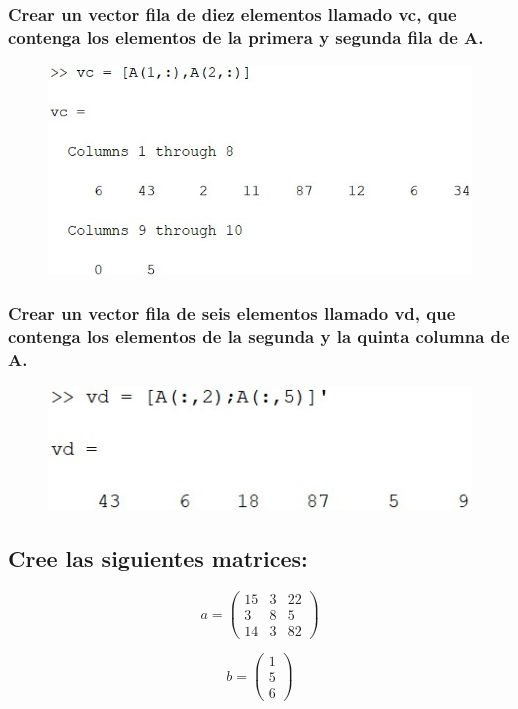 \documentclass{article}
\begin{document}
\subsubsection{Crear un vector fila de diez elementos llamado vc, que contenga los elementos de la primera y segunda fila de A.}
\begin{figure}[H]
    \centering
    \includegraphics[width = 15cm]{img6c.jpg}
\end{figure}
\subsubsection{Crear un vector fila de seis elementos llamado vd, que contenga los elementos de la segunda y la quinta columna de A.}
\begin{figure}[H]
    \centering
    \includegraphics[width = 12cm]{img6d.jpg}
\end{figure}
\newpage
\subsection{Cree las siguientes matrices:}

\begin{equation*}
a =
\begin{pmatrix}
15 & 3 & 22 \\
3 & 8 & 5 \\
14 & 3 & 82
\end{pmatrix}
\end{equation*}

\begin{equation*}
b =
\begin{pmatrix}
1 \\
5 \\
6
\end{pmatrix}
\end{equation*}
\end{document}
